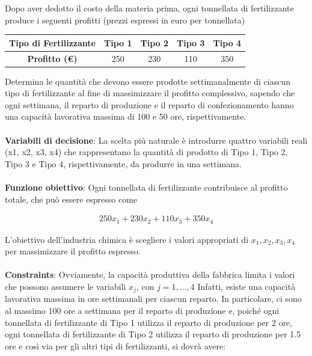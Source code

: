 \documentclass[a4paper, 11pt]{article}
\begin{document}
        Dopo aver dedotto il costo della materia prima, ogni tonnellata di fertilizzante produce i seguenti profitti (prezzi espressi in euro per tonnellata)

        \begin{table}[ht]
            \centering
            \begin{tabular}{|c|c|c|c|c|}
            \hline
            \textbf{Tipo di Fertilizzante} & \textbf{Tipo 1} & \textbf{Tipo 2} & \textbf{Tipo 3} & \textbf{Tipo 4} \\ \hline
            \textbf{Profitto (€)}          & 250             & 230             & 110             & 350             \\ \hline
            \end{tabular}
        \end{table}
        Determina le quantità che devono essere prodotte settimanalmente di ciascun tipo di fertilizzante al fine di massimizzare il profitto complessivo, sapendo che ogni settimana, il reparto di produzione e il reparto di confezionamento hanno una capacità lavorativa massima di 100 e 50 ore, rispettivamente.

        \paragraph{}
        \textbf{Variabili di decisione}: La scelta più naturale è introdurre quattro variabili reali (x1, x2, x3, x4) che rappresentano la quantità di prodotto di Tipo 1, Tipo 2, Tipo 3 e Tipo 4, rispettivamente, da produrre in una settimana.
        \paragraph{}
        \textbf{Funzione obiettivo}: Ogni tonnellata di fertilizzante contribuisce al profitto totale, che può essere espresso come

        \begin{align*}
            250x_1+230x_2+110x_3+350x_4
        \end{align*}

        L'obiettivo dell'industria chimica è scegliere i valori appropriati di $x_1, x_2, x_3, x_4$ per massimizzare il profitto espresso.

        \paragraph{}
        \textbf{Constraints}: Ovviamente, la capacità produttiva della fabbrica limita i valori che possono assumere le variabili $x_j$, con $j = 1,\ldots,4$ Infatti, esiste una capacità lavorativa massima in ore settimanali per ciascun reparto. In particolare, ci sono al massimo 100 ore a settimana per il reparto di produzione e, poiché ogni tonnellata di fertilizzante di Tipo 1 utilizza il reparto di produzione per 2 ore, ogni tonnellata di fertilizzante di Tipo 2 utilizza il reparto di produzione per 1.5 ore e così via per gli altri tipi di fertilizzanti, si dovrà avere:
\end{document}
